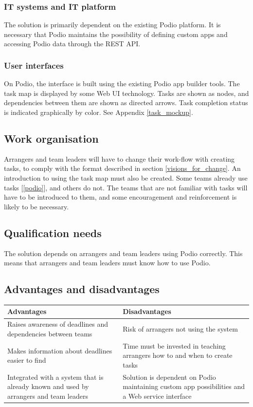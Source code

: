 \subsubsection{IT systems and IT platform}
The solution is primarily dependent on the existing Podio platform. It is necessary that Podio maintains the possibility of defining custom apps and accessing Podio data through the REST API.

\subsubsection{User interfaces}
On Podio, the interface is built using the existing Podio app builder tools. The task map is
displayed by some Web UI technology. Tasks are shown as nodes, and dependencies between them are
shown as directed arrows. Task completion status is indicated graphically by color. See Appendix
\ref{task_mockup}.

\subsection{Work organisation}
\label{sub:work_organisation}
Arrangers and team leaders will have to change their work-flow with creating tasks, to comply with
the format described in section \ref{visions_for_change}. An introduction to using the task map must
also be created. Some teams already use tasks [\ref{podio}], and others do not. The teams that are not familiar with tasks will have to be introduced to them, and some encouragement and reinforcement is likely to be necessary.

\subsection{Qualification needs}
\label{sub:qualification_needs}
The solution depends on arrangers and team leaders using Podio correctly. This means that arrangers and team leaders must know how to use Podio.

\subsection{Advantages and disadvantages}
\label{sec:advantages_disadvantages}
\begin{center}
    \begin{tabular}{ | p{7cm} | p{7cm} |}
    \hline
    \textbf{Advantages} & \textbf{Disadvantages}  \\ \hline
     Raises awareness of deadlines and dependencies between teams & Risk of arrangers not using the system\\ \hline
     Makes information about deadlines easier to find & Time must be invested in teaching arrangers how to and when to create tasks\\ \hline
     Integrated with a system that is already known and used by arrangers and team leaders & Solution is dependent on Podio maintaining custom app possibilities and a Web service interface \\ \hline
    \end{tabular}
\end{center}


